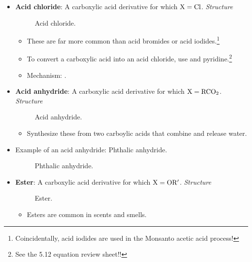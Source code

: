 \documentclass[../notes.tex]{subfiles}
\begin{document}
\begin{itemize}
    \item \textbf{Acid chloride}: A carboxylic acid derivative for which $\ce{X}=\ce{Cl}$. \emph{Structure}
    \begin{figure}[H]
        \centering
        \footnotesize
        \caption{Acid chloride.}
        \label{fig:carbAcidCl}
    \end{figure}
    \begin{itemize}
        \item These are far more common than acid bromides or acid iodides.\footnote{Coincidentally, acid iodides are used in the Monsanto acetic acid process!}
        \item To convert a carboxylic acid into an acid chloride, use  and pyridine.\footnote{See the 5.12 equation review sheet!!}
        \item Mechanism: \textcite[214-215]{bib:Clayden}.
    \end{itemize}
    \item \textbf{Acid anhydride}: A carboxylic acid derivative for which $\ce{X}=\ce{RCO2}$. \emph{Structure}
    \begin{figure}[h!]
        \centering
        \footnotesize
        \caption{Acid anhydride.}
        \label{fig:carbAcidAnh}
    \end{figure}
    \begin{itemize}
        \item Synthesize these from two carboylic acids that combine and release water.
    \end{itemize}
    \item Example of an acid anhydride: Phthalic anhydride.
    \begin{figure}[h!]
        \centering
        \footnotesize
        \caption{Phthalic anhydride.}
        \label{fig:phthalicAnhydride}
    \end{figure}
    \item \textbf{Ester}: A carboxylic acid derivative for which $\ce{X}=\ce{OR$'$}$. \emph{Structure}
    \begin{figure}[h!]
        \centering
        \footnotesize
        \caption{Ester.}
        \label{fig:carbEster}
    \end{figure}
    \begin{itemize}
        \item Esters are common in scents and smells.

\end{itemize}
\end{itemize}
\end{document}
